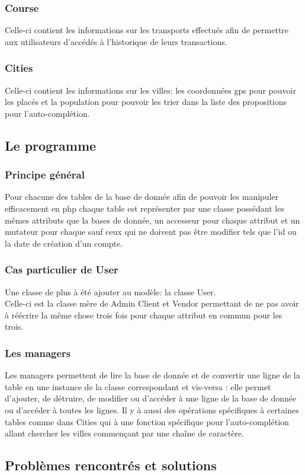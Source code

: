 \documentclass{article}
\begin{document}
		\subsubsection{Course}
			Celle-ci contient les informations sur les transports effectués afin de permettre aux utilisateurs d'accédés à l'historique de leurs transactions.
		\subsubsection{Cities}
			Celle-ci contient les informations sur les villes: les coordonnées gps pour pouvoir les placés et la population pour pouvoir les trier dans la liste des propositions pour l’auto-complétion.
	\subsection{Le programme}
		\subsubsection{Principe général}
			Pour chacune des tables de la base de donnée afin de pouvoir les manipuler efficacement en php chaque table est représenter par une classe possédant les mêmes attributs que la bases de donnée, un accesseur pour chaque attribut et un mutateur pour chaque sauf ceux qui ne doivent pas être modifier tels que l'id ou la date de création d'un compte.
		\subsubsection{Cas particulier de User}
			Une classe de plus à été ajouter au modèle: la classe User.\\ Celle-ci est la classe mère de Admin Client et Vendor permettant de ne pas avoir à réécrire la même chose trois fois pour chaque attribut en commun pour les trois.
		\subsubsection{Les managers}
			Les managers permettent de lire la base de donnée et de convertir une ligne de la table en une instance de la classe correspondant et vis-versa : elle permet d'ajouter, de détruire, de modifier ou d'accéder à une ligne de la base de donnée ou d'accéder à toutes les lignes. Il y à aussi des opérations spécifiques à certaines tables comme dans Cities qui à une fonction spécifique pour l'auto-complétion allant chercher les villes commençant par une chaîne de caractère.
	\subsection{Problèmes rencontrés et solutions}
\end{document}
